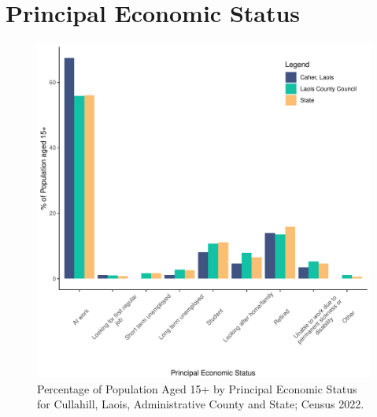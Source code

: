 \documentclass{article}
\begin{document}
  
\pagebreak
\section{Principal Economic Status}\label{sect:PES}
\begin{figure}[H]
	\centering
	\includegraphics[width = 140mm]{../figures/PESED.pdf}
	\caption{Percentage of Population Aged 15+ by Principal Economic Status for Cullahill, Laois, Administrative County and State; Census 2022.}
	\label{fig:vbnv}
	\end{figure}
\end{document}
